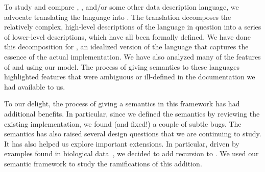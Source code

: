 To study and compare \pads{}, \datascript{}, and/or
some other data description language, we advocate translating
the language into \ddc{}.  The translation decomposes
the relatively complex, high-level descriptions of the language 
in question into a series of lower-level
\ddc{} descriptions, which have all been formally defined.  
We have done this decomposition for \ipads{}, an idealized version of the
\pads{} language that captures the essence of the actual 
implementation.  We have also analyzed many of the features of
\packettypes{} and \datascript{} using our model.  The process of
giving semantics to these languages
highlighted features that were ambiguous or 
ill-defined in the documentation we had available to us.

To our delight, the process of giving \pads{} 
a semantics in this framework has had additional benefits.  
In particular, since we defined the
semantics by reviewing the existing 
implementation, we found (and fixed!) a couple of subtle bugs.  The semantics has also raised several
design questions that we are continuing to study. 
It has also helped us explore important extensions.
In particular, driven by examples found in biological data~\cite{geneontology,newick}, we decided to add recursion to \pads{}.
We used our semantic framework to study the ramifications of this addition.

